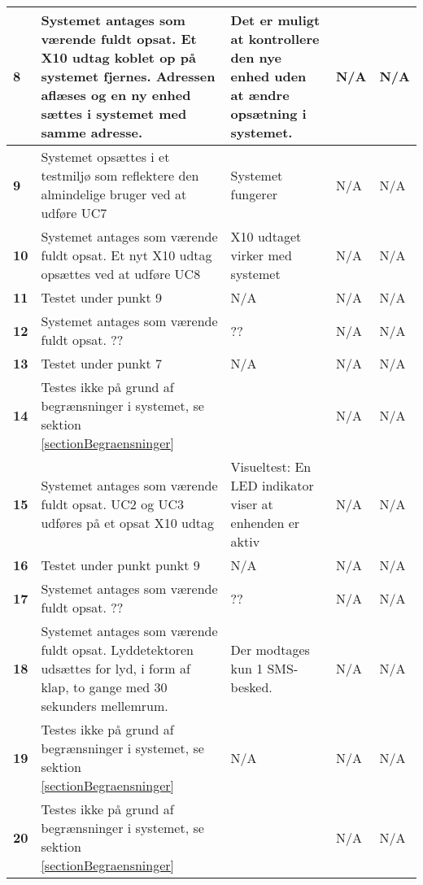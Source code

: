 \begin{center}
\begin{longtable}{|p{}|p{}|p{3cm}|p{3cm}|p{3cm}|}
\textbf{8} &
Systemet antages som værende fuldt opsat.\newline
Et X10 udtag koblet op på systemet fjernes. Adressen aflæses og en ny enhed sættes i systemet med samme adresse.&
Det er muligt at kontrollere den nye enhed uden at ændre opsætning i systemet.&
N/A &
N/A \\\hline

\textbf{9} &
Systemet opsættes i et testmiljø som reflektere den almindelige bruger ved at udføre UC7&
Systemet fungerer&
N/A &
N/A \\\hline

\textbf{10} &
Systemet antages som værende fuldt opsat.\newline
Et nyt X10 udtag opsættes ved at udføre UC8 &
X10 udtaget virker med systemet&
N/A &
N/A \\\hline

\textbf{11} &
Testet under punkt 9&
N/A &
N/A &
N/A \\\hline

\textbf{12} &
Systemet antages som værende fuldt opsat.\newline
??&
??&
N/A &
N/A \\\hline

\textbf{13} &
Testet under punkt 7&
N/A &
N/A &
N/A \\\hline

\textbf{14} &
Testes ikke på grund af begrænsninger i systemet, se sektion \ref{sectionBegraensninger}&
&
N/A &
N/A \\\hline

\textbf{15} &
Systemet antages som værende fuldt opsat.\newline
UC2 og UC3 udføres på et opsat X10 udtag&
Visueltest: En LED indikator viser at enhenden er aktiv&
N/A &
N/A \\\hline

\textbf{16} &
Testet under punkt punkt 9&
N/A &
N/A &
N/A \\\hline

\textbf{17} &
Systemet antages som værende fuldt opsat.\newline
??&
??&
N/A &
N/A \\\hline

\textbf{18} &
Systemet antages som værende fuldt opsat.\newline
Lyddetektoren udsættes for lyd, i form af klap, to gange med 30 sekunders mellemrum.&
Der modtages kun 1 SMS-besked.&
N/A &
N/A \\\hline

\textbf{19} &
Testes ikke på grund af begrænsninger i systemet, se sektion \ref{sectionBegraensninger}&
N/A &
N/A &
N/A \\\hline

\textbf{20} &
Testes ikke på grund af begrænsninger i systemet, se sektion \ref{sectionBegraensninger}&
&
N/A &
N/A \\\hline



	\end{longtable}
	\label{ATUC8} 
\end{center}
